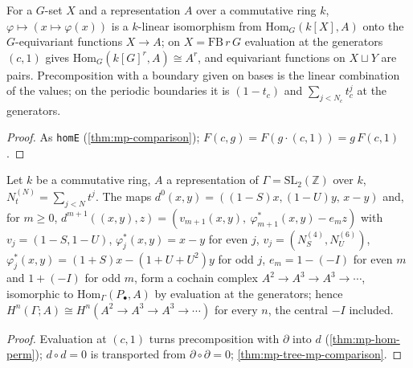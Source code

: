 \begin{theorem}\label{thm:mp-hom-perm}
  \leanok
  For a $G$-set $X$ and a representation $A$ over a commutative ring $k$, $\varphi\mapsto(x\mapsto\varphi(x))$ is a $k$-linear
  isomorphism from $\mathrm{Hom}_G(k[X],A)$ onto the $G$-equivariant functions $X\to A$; on $X=\mathrm{FB}\,r\,G$ evaluation at the
  generators $(c,1)$ gives $\mathrm{Hom}_G(k[G]^r,A)\cong A^r$, and equivariant functions on $X\sqcup Y$ are pairs.  Precomposition
  with a boundary given on bases is the linear combination of the values; on the periodic boundaries it is $(1-t_c)$ and
  $\sum_{j<N_c}t_c^j$ at the generators.
\end{theorem}
\begin{proof}
  \leanok
  As \texttt{homE} (\ref{thm:mp-comparison}); $F(c,g)=F(g\cdot(c,1))=g\,F(c,1)$.
\end{proof}

\begin{theorem}\label{thm:mp-tree-cochains}
  \leanok
  Let $k$ be a commutative ring, $A$ a representation of $\Gamma=\mathrm{SL}_2(\mathbb Z)$ over $k$, $N_t^{(N)}=\sum_{j<N}t^j$.  The maps
  $d^0(x,y)=((1-S)x,(1-U)y,\,x-y)$ and, for $m\ge0$,
  $d^{m+1}((x,y),z)=(v_{m+1}(x,y),\ \varphi^*_{m+1}(x,y)-e_m z)$ with $v_j=(1-S,1-U)$, $\varphi^*_j(x,y)=x-y$ for even $j$,
  $v_j=(N_S^{(4)},N_U^{(6)})$, $\varphi^*_j(x,y)=(1+S)x-(1+U+U^2)y$ for odd $j$, $e_m=1-(-I)$ for even $m$ and $1+(-I)$ for odd $m$,
  form a cochain complex $A^2\to A^3\to A^3\to\cdots$, isomorphic to $\mathrm{Hom}_\Gamma(P_\bullet,A)$ by evaluation at the generators;
  hence $H^n(\Gamma;A)\cong H^n(A^2\to A^3\to A^3\to\cdots)$ for every $n$, the central $-I$ included.
\end{theorem}
\begin{proof}
  \leanok
  Evaluation at $(c,1)$ turns precomposition with $\partial$ into $d$ (\ref{thm:mp-hom-perm}); $d\circ d=0$ is transported from
  $\partial\circ\partial=0$; \ref{thm:mp-tree-mp-comparison}.
\end{proof}

